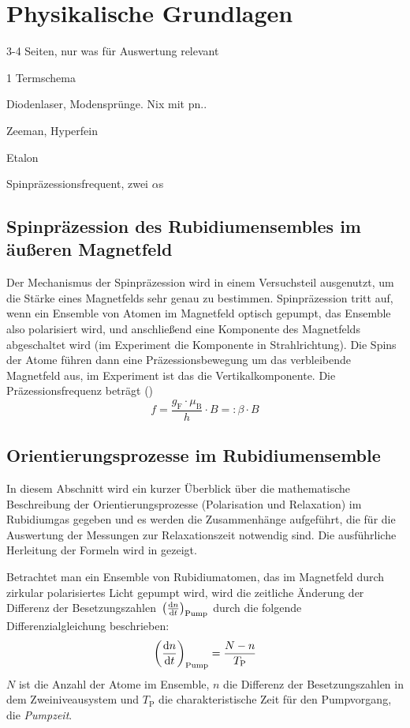 \section{Physikalische Grundlagen}

3-4 Seiten, nur was für Auswertung relevant

1 Termschema

Diodenlaser, Modensprünge. Nix mit pn..

Zeeman, Hyperfein

Etalon

Spinpräzessionsfrequent, zwei $\alpha$s

\subsection{Spinpräzession des Rubidiumensembles im äußeren Magnetfeld}
Der Mechanismus der Spinpräzession wird in einem Versuchsteil ausgenutzt,
um die Stärke eines Magnetfelds sehr genau zu bestimmen.
Spinpräzession tritt auf, wenn ein Ensemble von Atomen im Magnetfeld optisch gepumpt,
das Ensemble also polarisiert wird, und anschließend eine Komponente
des Magnetfelds abgeschaltet wird (im Experiment die Komponente in Strahlrichtung).
Die Spins der Atome führen dann eine Präzessionsbewegung um das verbleibende Magnetfeld aus,
im Experiment ist das die Vertikalkomponente.
Die Präzessionsfrequenz beträgt (\cite{staatsex})
\begin{equation}
  f=\frac{g_\text{F} \cdot \mu_\text{B}}{h} \cdot B=: \beta \cdot B
\end{equation}




\subsection{Orientierungsprozesse im Rubidiumensemble}
In diesem Abschnitt wird ein kurzer Überblick über die mathematische Beschreibung der Orientierungsprozesse
(Polarisation und Relaxation) im Rubidiumgas gegeben und es werden die Zusammenhänge aufgeführt, die für die
Auswertung der Messungen zur Relaxationszeit notwendig sind.
Die ausführliche Herleitung der Formeln wird in \cite{staatsex} gezeigt.

Betrachtet man ein Ensemble von Rubidiumatomen, das im Magnetfeld durch zirkular polarisiertes Licht gepumpt wird,
wird die zeitliche Änderung der Differenz der Besetzungszahlen~$\left(\frac{\mathrm{d} n}{\mathrm{d} t}\right)_{\text{Pump}}$
durch die folgende Differenzialgleichung beschrieben:
\begin{equation}
  \left(\frac{\mathrm{d} n}{\mathrm{d} t}\right)_{\text{Pump}}=\frac{N-n}{T_\text{P}}
\end{equation}
$N$ ist die Anzahl der Atome im Ensemble, $n$ die Differenz der Besetzungszahlen in dem Zweiniveausystem
und $T_\text{P}$ die charakteristische Zeit für den Pumpvorgang, die \emph{Pumpzeit}.

